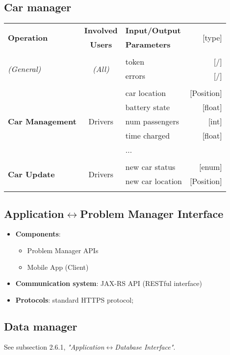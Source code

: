 \subsection{Car manager}
	\begin{center}
		\begin{tabular}{ l | c | l   r }
			\multirow{2}{*}{\textbf{Operation}} & \textbf{Involved} & \textbf{Input/Output} & \multirow{2}{*}{[type]}\\
			& \textbf{Users} & \textbf{Parameters} & \\ [1.5ex]
			\hline\hline\\
			
			\multirow{2}{*}{\textit{(General)}}
				& \multirow{2}{*}{\textit{(All)}}
					&	token & [/]\\
					&&	errors & [/]\\ [1.5ex]
			\hline\\
			
			\multirow{5}{*}{\textbf{Car Management}}
				& \multirow{5}{*}{Drivers}
					&	car location & [Position]\\
					&&	battery state & [float]\\
					&&	num passengers & [int]\\
					&&	time charged & [float]\\
					&&	... & \\ [1.5ex]
			\hline\\
			
			\multirow{2}{*}{\textbf{Car Update}}
				& \multirow{2}{*}{Drivers}
					&	new car status & [enum]\\
					&&	new car location & [Position]\\ [1.5ex]
			\hline\\

		\end{tabular}
	\end{center}
\newpage
\subsection{Application$\leftrightarrow$Problem Manager Interface}
	\begin{itemize}
		\item [] \textbf{Components}:
			\begin{itemize}
				\item Problem Manager APIs
				\item Mobile App (Client)
			\end{itemize}			
		\item [] \textbf{Communication system}: JAX-RS API (RESTful interface)
		\item [] \textbf{Protocols}: standard HTTPS protocol;
	\end{itemize}

\subsection{Data manager}
	See subsection 2.6.1, \textit{"Application$\leftrightarrow$Database Interface"}.